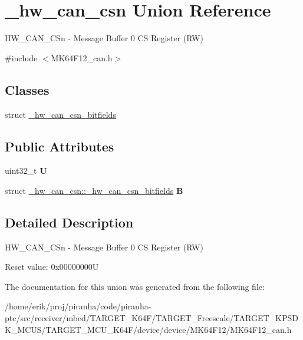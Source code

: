 \hypertarget{union__hw__can__csn}{}\section{\+\_\+hw\+\_\+can\+\_\+csn Union Reference}
\label{union__hw__can__csn}


H\+W\+\_\+\+C\+A\+N\+\_\+\+C\+Sn -\/ Message Buffer 0 CS Register (RW)  




{\ttfamily \#include $<$M\+K64\+F12\+\_\+can.\+h$>$}

\subsection*{Classes}
\begin{DoxyCompactItemize}
\item 
struct \hyperlink{struct__hw__can__csn_1_1__hw__can__csn__bitfields}{\+\_\+hw\+\_\+can\+\_\+csn\+\_\+bitfields}
\end{DoxyCompactItemize}
\subsection*{Public Attributes}
\begin{DoxyCompactItemize}
\item 
uint32\+\_\+t {\bfseries U}\hypertarget{union__hw__can__csn_aa3ece1e2342879697137bf6062a4250c}{}\label{union__hw__can__csn_aa3ece1e2342879697137bf6062a4250c}

\item 
struct \hyperlink{struct__hw__can__csn_1_1__hw__can__csn__bitfields}{\+\_\+hw\+\_\+can\+\_\+csn\+::\+\_\+hw\+\_\+can\+\_\+csn\+\_\+bitfields} {\bfseries B}\hypertarget{union__hw__can__csn_adec4ae52aa79d0c005603fea19421562}{}\label{union__hw__can__csn_adec4ae52aa79d0c005603fea19421562}

\end{DoxyCompactItemize}


\subsection{Detailed Description}
H\+W\+\_\+\+C\+A\+N\+\_\+\+C\+Sn -\/ Message Buffer 0 CS Register (RW) 

Reset value\+: 0x00000000U 

The documentation for this union was generated from the following file\+:\begin{DoxyCompactItemize}
\item 
/home/erik/proj/piranha/code/piranha-\/ptc/src/receiver/mbed/\+T\+A\+R\+G\+E\+T\+\_\+\+K64\+F/\+T\+A\+R\+G\+E\+T\+\_\+\+Freescale/\+T\+A\+R\+G\+E\+T\+\_\+\+K\+P\+S\+D\+K\+\_\+\+M\+C\+U\+S/\+T\+A\+R\+G\+E\+T\+\_\+\+M\+C\+U\+\_\+\+K64\+F/device/device/\+M\+K64\+F12/M\+K64\+F12\+\_\+can.\+h\end{DoxyCompactItemize}
